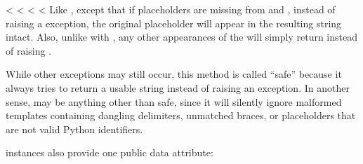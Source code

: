\documentclass[letterpaper,10pt,english]{sphinxmanual}
\begin{document}
\begin{fulllineitems}
\begin{fulllineitems}
\end{fulllineitems}


\vspace{5px}

\begin{fulllineitems}
\label{\detokenize{string:string.Template.safe_substitute}}
<%
\pysigstartsignatures
<%
<%
<%
Like {\hyperref[\detokenize{string:string.Template.substitute}]{}}, except that if placeholders are missing from
 and , instead of raising a  exception, the
original placeholder will appear in the resulting string intact.  Also,
unlike with {\hyperref[\detokenize{string:string.Template.substitute}]{}}, any other appearances of the \sphinxcode{\sphinxupquote{\$}} will
simply return \sphinxcode{\sphinxupquote{\$}} instead of raising .

While other exceptions may still occur, this method is called “safe”
because it always tries to return a usable string instead of
raising an exception.  In another sense, {\hyperref[\detokenize{string:string.Template.safe_substitute}]{}} may be
anything other than safe, since it will silently ignore malformed
templates containing dangling delimiters, unmatched braces, or
placeholders that are not valid Python identifiers.

\end{fulllineitems}


{\hyperref[\detokenize{string:string.Template}]{}} instances also provide one public data attribute:

\vspace{5px}


\end{fulllineitems}
\end{document}
